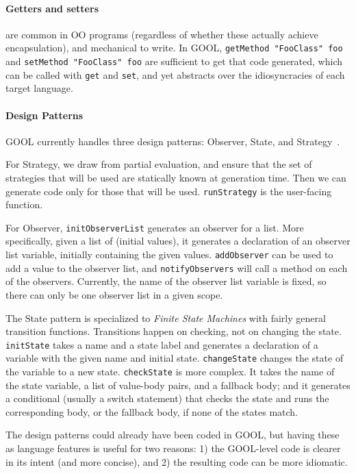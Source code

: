 \documentclass[sigplan,screen,10pt]{acmart}
\begin{document}
\paragraph{Getters and setters} are common in OO programs (regardless of
whether these actually achieve encapsulation), and mechanical to write.
In GOOL, \verb|getMethod "FooClass" foo| and \verb|setMethod "FooClass" foo|
are sufficient to get that code generated, which can be called with
\verb|get| and \verb|set|, and yet abstracts over the idiosyncracies of
each target language.

\paragraph{Design Patterns}
GOOL currently handles three design patterns: Observer,
State, and Strategy~\cite{gamma1995design}. 

For Strategy, we draw from partial evaluation, and ensure that the set of
strategies that will be used are statically known at generation
time.  Then we can generate code only for those that will
be used.  \verb|runStrategy| is the user-facing function.

For Observer, \verb|initObserverList| generates an observer for a list.  More
specifically, given a list of (initial values), it generates a declaration of
an observer list variable, initially containing the given values.
\verb|addObserver| can be used to add a value to the observer list, and
\verb|notifyObservers| will call a method on each of the observers. Currently,
the name of the observer list variable is fixed, so there can only be one
observer list in a given scope.

The State pattern is specialized to \emph{Finite State Machines}
with fairly general transition functions.  Transitions happen on checking, not
on changing the state. \verb|initState| takes a name and a state label and
generates a declaration of a variable with the given name and initial state.
\verb|changeState| changes the state of the variable to a new state.
\verb|checkState| is more complex.  It takes the name of the state variable, a
list of value-body pairs, and a fallback body; and it generates a conditional
(usually a switch statement) that checks the state and runs the corresponding
body, or the fallback body, if none of the states match.

The design patterns could already have been coded in GOOL, but
having these as language features is useful for two reasons: 1) the GOOL-level
code is clearer in its intent (and more concise), and 2) the resulting code
can be more idiomatic.
\end{document}
